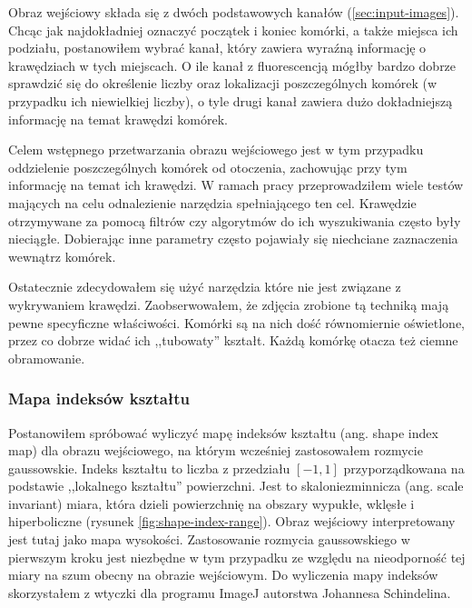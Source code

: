 \documentclass[declaration,shortabstract,mgr]{iithesis}
\begin{document}
Obraz wejściowy składa się z dwóch podstawowych kanałów (\ref{sec:input-images}).
Chcąc jak najdokładniej oznaczyć początek i koniec komórki, a także miejsca ich podziału, postanowiłem wybrać kanał, który zawiera wyraźną informację o krawędziach w tych miejscach.
O ile kanał z fluorescencją mógłby bardzo dobrze sprawdzić się do określenie liczby oraz lokalizacji poszczególnych komórek (w przypadku ich niewielkiej liczby), o tyle drugi kanał zawiera dużo dokładniejszą informację na temat krawędzi komórek.

Celem wstępnego przetwarzania obrazu wejściowego jest w tym przypadku oddzielenie poszczególnych komórek od otoczenia, zachowując przy tym informację na temat ich krawędzi. W ramach pracy przeprowadziłem wiele testów mających na celu odnalezienie narzędzia spełniającego ten cel. Krawędzie otrzymywane za pomocą filtrów czy algorytmów do ich wyszukiwania często były nieciągłe. Dobierając inne parametry często pojawiały się niechciane zaznaczenia wewnątrz komórek.

Ostatecznie zdecydowałem się użyć narzędzia które nie jest związane z wykrywaniem krawędzi. Zaobserwowałem, że zdjęcia zrobione tą techniką mają pewne specyficzne właściwości. Komórki są na nich dość równomiernie oświetlone, przez co dobrze widać ich ,,tubowaty'' kształt. Każdą komórkę otacza też ciemne obramowanie.

\subsubsection{Mapa indeksów kształtu}

Postanowiłem spróbować wyliczyć mapę indeksów kształtu (ang. shape index map) dla obrazu wejściowego, na którym wcześniej zastosowałem rozmycie gaussowskie. Indeks kształtu to liczba z przedziału $[-1, 1]$ przyporządkowana na podstawie ,,lokalnego kształtu'' powierzchni. Jest to skaloniezminnicza (ang. scale invariant) miara, która dzieli powierzchnię na obszary wypukłe, wklęsłe i hiperboliczne (rysunek \ref{fig:shape-index-range})\cite{paper:shape-index}. Obraz wejściowy interpretowany jest tutaj jako mapa wysokości. Zastosowanie rozmycia gaussowskiego w pierwszym kroku jest niezbędne w tym przypadku ze względu na nieodporność tej miary na szum obecny na obrazie wejściowym. Do wyliczenia mapy indeksów skorzystałem z wtyczki dla programu ImageJ autorstwa Johannesa Schindelina\cite{plugin:shape-index-map}.
\end{document}
